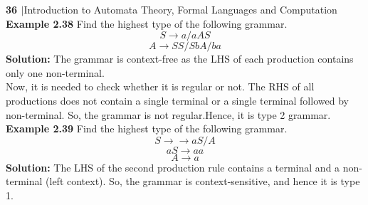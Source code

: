 \documentclass[12pt]{book}
\begin{document}


\textbf{36 $\boldsymbol{\mid}$}Introduction to Automata Theory, Formal Languages and Computation\\

\textbf{\large Example 2.38} Find the highest type of the following grammar.\\
\[S \rightarrow a/aAS\]
\[A \rightarrow SS/SbA/ba\]
\textbf{Solution:} The grammar is context-free as the LHS of each production contains only one
non-terminal.\\
Now, it is needed to check whether it is regular or not. The RHS of all productions does not contain a single terminal or a single terminal followed by non-terminal. So, the grammar is not regular.Hence, it is type 2 grammar.\\

\textbf{\large Example 2.39} Find the highest type of the following grammar.
\[S →\rightarrow aS/A\]
\[aS \rightarrow aa\]
\[A \rightarrow a\]
\textbf{Solution:} The LHS of the second production rule contains a terminal and a non-terminal (left
context).
So, the grammar is context-sensitive, and hence it is type 1.\\
\end{document}
